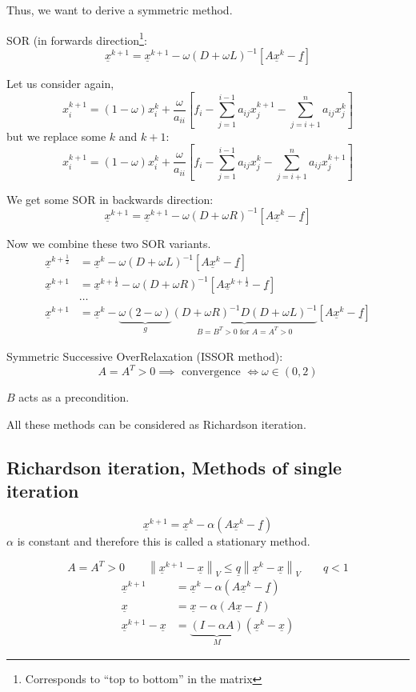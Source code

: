\documentclass{article}
\newcommand{\norm}[1]{\left\|#1\right\|}
\begin{document}
Thus, we want to derive a symmetric method.

SOR (in forwards direction\footnote{Corresponds to \enquote{top to bottom} in the matrix}:
\[ \underline{x}^{k+1} = \underline{x}^{k+1} - \omega(D + \omega L)^{-1} \left[A \underline{x}^k - \underline{f}\right] \]

Let us consider again,
\[ x_i^{k+1} = (1 - \omega) x_i^k + \frac{\omega}{a_{ii}} \left[ f_i - \sum_{j=1}^{i-1} a_{ij} x_j^{k+1} - \sum_{j=i+1}^n a_{ij} x_j^k\right] \]
but we replace some $k$ and $k+1$:
\[ x_i^{k+1} = (1 - \omega) x_i^k + \frac{\omega}{a_{ii}} \left[ f_i - \sum_{j=1}^{i-1} a_{ij} x_j^{k} - \sum_{j=i+1}^n a_{ij} x_j^{k+1}\right] \]

We get some SOR in backwards direction:
\[ \underline{x}^{k+1} = \underline{x}^{k+1} - \omega(D + \omega R)^{-1} \left[A \underline{x}^k - \underline{f}\right] \]

Now we combine these two SOR variants.
\begin{align*}
  \underline{x}^{k+\frac12} &= \underline{x}^k - \omega (D + \omega L)^{-1} \left[ A \underline{x}^k - \underline{f} \right] \\
  \underline{x}^{k+1} &= \underline{x}^{k+\frac12} - \omega (D + \omega R)^{-1} \left[ A \underline{x}^{k+\frac12} - \underline{f} \right] \\
    & \ldots \\
  \underline{x}^{k+1} &= \underline{x}^k - \underbrace{\omega (2 - \omega)}_{g} \underbrace{(D + \omega R)^{-1} D (D + \omega L)^{-1}}_{B = B^T > 0 \text{ for } A = A^T > 0} \left[ A \underline{x}^k - \underline{f} \right]
\end{align*}

Symmetric Successive OverRelaxation (ISSOR method):
\[ A = A^T > 0 \implies \text{ convergence } \iff \omega \in (0,2) \]

$B$ acts as a precondition.

All these methods can be considered as Richardson iteration.

\subsection{Richardson iteration, Methods of single iteration}
%
\[ \underline{x}^{k+1} = \underline{x}^k - \alpha (A \underline{x}^k - \underline{f}) \]
$\alpha$ is constant and therefore this is called a stationary method.

\[ A = A^T > 0 \qquad \norm{\underline{x}^{k+1} - \underline{x}}_V \leq \underline{q} \norm{\underline{x}^k - \underline{x}}_V \qquad q < 1 \]
\begin{align*}
  \underline{x}^{k+1} &= \underline{x}^k - \alpha (A \underline{x}^k - \underline{f}) \\
  \underline{x}       &= \underline{x} - \alpha (A \underline{x} - \underline{f}) \\
  \underline{x}^{k+1} - \underline{x} &= \underbrace{(I - \alpha A)}_{M} (\underline{x}^k - \underline{x})
\end{align*}
\end{document}
